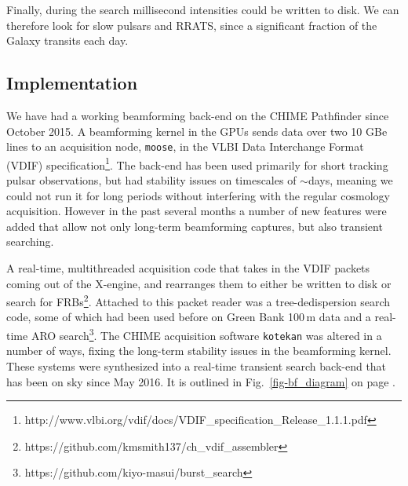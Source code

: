 Finally, during the search 
millisecond intensities could be written to disk.  
We can therefore look for slow pulsars 
and RRATS, since a significant fraction of the 
Galaxy transits each day.

\subsection{Implementation}

We have had a working beamforming back-end on the CHIME 
Pathfinder since October 2015. 
A beamforming kernel in the GPUs sends data over two 10 GBe
lines to an acquisition node, {\tt moose}, 
in the VLBI Data Interchange Format (VDIF) 
specification\footnote{http://www.vlbi.org/vdif/docs/VDIF\_specification\_Release\_1.1.1.pdf}. 
The back-end has been used primarily 
for short tracking pulsar observations, but had stability issues 
on timescales of $\sim$days, meaning we could not run it 
for long periods without interfering with the regular cosmology acquisition. 
However in the past several months a number of new features 
were added that allow not only long-term beamforming captures, 
but also transient searching. 
 
A real-time, multithreaded acquisition code that takes in the VDIF 
packets coming out of the X-engine, and rearranges them to either be written to disk or search for 
FRBs\footnote{https://github.com/kmsmith137/ch\_vdif\_assembler}. Attached 
to this packet reader was a tree-dedispersion search code, some of 
which had been used before on Green Bank 100\,m data and a real-time ARO 
search\footnote{https://github.com/kiyo-masui/burst\_search}.
The CHIME acquisition software {\tt kotekan} was 
altered in a number of ways, fixing the long-term 
stability issues in the beamforming kernel. These systems 
were synthesized into a real-time transient search back-end 
that has been on sky since May 2016. 
It is outlined in Fig.~\ref{fig-bf_diagram}
on page \pageref{fig-bf_diagram}. 


